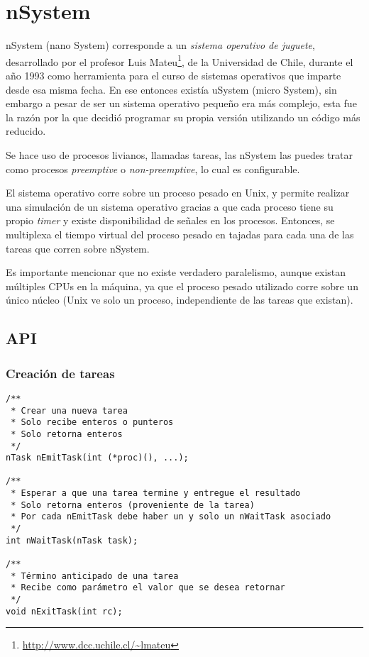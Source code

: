 %
%
%
%

\chapter{nSystem}
\label{nSystem}

nSystem (nano System) corresponde a un \textit{sistema operativo de juguete}, desarrollado por el profesor Luis Mateu\footnote{\url{http://www.dcc.uchile.cl/~lmateu}}, de la Universidad de Chile, durante el año 1993 como herramienta para el curso de sistemas operativos que imparte desde esa misma fecha. En ese entonces existía uSystem (micro System), sin embargo a pesar de ser un sistema operativo pequeño era más complejo, esta fue la razón por la que decidió programar su propia versión utilizando un código más reducido.

Se hace uso de procesos livianos, llamadas tareas, las nSystem las puedes tratar como procesos \textit{preemptive} o \textit{non-preemptive}, lo cual es configurable.

El sistema operativo corre sobre un proceso pesado en Unix, y permite realizar una simulación de un sistema operativo gracias a que cada proceso tiene su propio \textit{timer} y existe disponibilidad de señales en los procesos. Entonces, se multiplexa el tiempo virtual del proceso pesado en tajadas para cada una de las tareas que corren sobre nSystem.

Es importante mencionar que no existe verdadero paralelismo, aunque existan múltiples CPUs en la máquina, ya que el proceso pesado utilizado corre sobre un único núcleo (Unix ve solo un proceso, independiente de las tareas que existan).

\section{API}

\subsection{Creación de tareas}
\begin{verbatim}
/**
 * Crear una nueva tarea
 * Solo recibe enteros o punteros
 * Solo retorna enteros
 */
nTask nEmitTask(int (*proc)(), ...);

/**
 * Esperar a que una tarea termine y entregue el resultado
 * Solo retorna enteros (proveniente de la tarea)
 * Por cada nEmitTask debe haber un y solo un nWaitTask asociado
 */
int nWaitTask(nTask task);

/**
 * Término anticipado de una tarea
 * Recibe como parámetro el valor que se desea retornar
 */
void nExitTask(int rc);
\end{verbatim}

